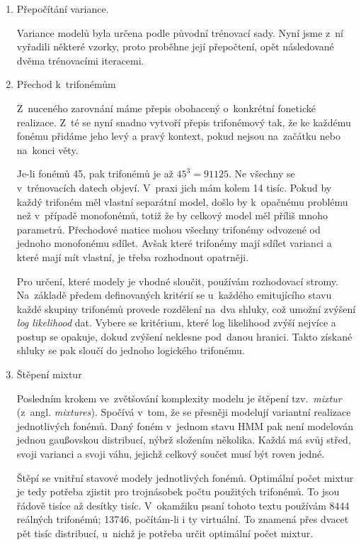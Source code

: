 \begin{enumerate}
\item{Přepočítání variance.}

Variance modelů byla určena podle původní trénovací sady. Nyní jsme z~ní
vyřadili některé vzorky, proto proběhne její přepočtení, opět následované dvěma
trénovacími iteracemi.

\item{Přechod k~trifonémům}
\label{item:htktrain:triphones}

Z~nuceného zarovnání máme přepis obohacený o~konkrétní fonetické realizace. Z~té
se nyní snadno vytvoří přepis trifonémový tak, že ke každému fonému přidáme
jeho levý a pravý kontext, pokud nejsou na~začátku nebo na~konci věty.

Je-li fonémů 45, pak trifonémů je až $45^3 = 91125$. Ne všechny se v~trénovacích
datech objeví. V~praxi jich mám kolem 14 tisíc. Pokud by každý trifoném měl
vlastní separátní model, došlo by k~opačnému problému než v~případě monofonémů,
totiž že by celkový model měl příliš mnoho parametrů. Přechodové matice mohou
všechny trifonémy odvozené od jednoho monofonému sdílet. Avšak které trifonémy
mají sdílet varianci a které mají mít vlastní, je třeba rozhodnout opatrněji.

Pro určení, které modely je vhodné sloučit, používám rozhodovací stromy.
Na~základě předem definovaných kritérií se u~každého emitujícího stavu každé
skupiny trifonémů provede rozdělení na~dva shluky, což umožní zvýšení
\textit{log likelihood} dat. Vybere se kritérium, které log likelihood
zvýší nejvíce a postup se opakuje, dokud zvýšení neklesne pod~danou hranici.
Takto získané shluky se pak sloučí do jednoho logického trifonému.

\item{Štěpení mixtur}

Posledním krokem ve~zvětšování komplexity modelu je štěpení tzv.~\textit{mixtur}
(z~angl. \textit{mixtures}). Spočívá v~tom, že se přesněji modelují variantní
realizace jednotlivých fonémů. Daný foném v~jednom stavu HMM pak není modelován jednou gaußovskou
distribucí, nýbrž složením několika. Každá má svůj střed, svoji varianci a svoji
váhu, jejichž celkový součet musí být roven jedné.

Štěpí se vnitřní stavové modely jednotlivých fonémů. Optimální počet
mixtur je tedy potřeba zjistit pro trojnásobek počtu použitých trifonémů. To
jsou řádově tisíce až desítky tisíc. V~okamžiku psaní tohoto textu používám 8444
reálných trifonémů; 13746, počítám-li i ty virtuální. To znamená přes dvacet pět
tisíc distribucí, u~nichž je potřeba určit optimální počet mixtur.


\end{enumerate}
